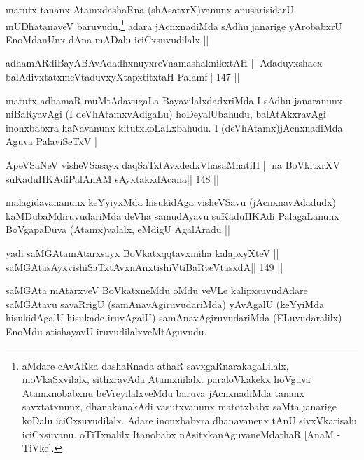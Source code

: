 \begin{artha}
matutx tananx AtamxdashaRna (shAsatxrX)vanunx anusarisidarU 
mUDhatanaveV baruvudu,\footnote[6]{aMdare cAvARka dashaRnada athaR 
savxgaRnarakagaLilalx, moVkaSxvilalx, sithxravAda Atamxnilalx. 
paraloVkakekx hoVguva Atamxnobabxnu beVreyilalxveMdu baruva 
jAcnxnadiMda tananx savxtatxnunx, dhanakanakAdi vasutxvanunx matotxbabx 
saMta janarige koDalu iciCxsuvudilalx. Adare inonxbabxra dhanavanenx 
tAnU sivxVkarisalu iciCxsuvanu. oTiTxnalilx Itanobabx nAsitxkanAguvaneMdathaR [AnaM - TiVke].} adara jAcnxnadiMda sAdhu janarige yArobabxrU EnoMdanUnx dAna mADalu iciCxsuvudilalx ||
\end{artha}

\begin{shl}
adhamARdiBayABAvAdadhxnuyxreVnamashaknikxtAH ||
Adaduyxshacx balAdivxtatxmeVtaduvxyXtapxtitxtaH Palamf\hfill || 147 ||
\end{shl}

\begin{artha}
matutx adhamaR muMtAdavugaLa BayavilalxdadxriMda I sAdhu janaranunx niBaRyavAgi (I deVhAtamxvAdigaLu) hoDeyalUbahudu, balAtAkxravAgi inonxbabxra haNavanunx kitutxkoLaLxbahudu. I (deVhAtamx)jAcnxnadiMda Aguva PalaviSeTxV |
\end{artha}


\begin{shl}
ApeVSaNeV visheVSasayx daqSaTxtAvxdedxVhasaMhatiH ||
na BoVkitxrXV suKaduHKAdiPalAnAM sAyxtakxdAcana\hfill || 148 ||
\end{shl}

\begin{artha}
malagidavananunx keYyiyxMda hisukidAga visheVSavu (jAcnxnavAdadudx) kaMDubaMdiruvudariMda deVha samudAyavu suKaduHKAdi PalagaLanunx BoVgapaDuva (Atamx)valalx, eMdigU AgalAradu ||
\end{artha}


\begin{shl}
yadi saMGAtamAtarxsayx BoVkatxqqtavxmiha kalapxyXteV ||
saMGAtasAyxvishiSaTxtAvxnAnxtishiVtiBaRveVtasxdA\hfill || 149 ||
\end{shl}

\begin{artha}
saMGAta mAtarxveV BoVkatxneMdu oMdu veVLe kalipxsuvudAdare saMGAtavu 
savaRrigU (samAnavAgiruvudariMda) yAvAgalU (keYyiMda hisukidAgalU 
hisukade iruvAgalU) samAnavAgiruvudariMda (ELuvudaralilx) EnoMdu 
atishayavU iruvudilalxveMtAguvudu.
\end{artha}

